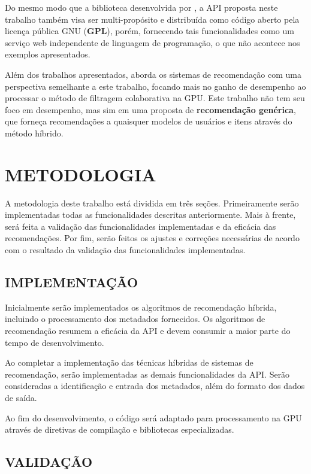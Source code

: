 \documentclass[12pt, openright, oneside, a4paper, brazil]{abntex2}
\begin{document}
Do mesmo modo que a biblioteca desenvolvida por , a API proposta neste trabalho também visa ser multi-propósito e distribuída como código aberto pela licença pública GNU (\textbf{GPL}), porém, fornecendo tais funcionalidades como um serviço web independente de linguagem de programação, o que não acontece nos exemplos apresentados.

Além dos trabalhos apresentados,  aborda os sistemas de recomendação com uma perspectiva semelhante a este trabalho, focando mais no ganho de desempenho ao processar o método de filtragem colaborativa na GPU. Este trabalho não tem seu foco em desempenho, mas sim em uma proposta de \textbf{recomendação genérica}, que forneça recomendações a quaisquer modelos de usuários e itens através do método híbrido.

%
%

\chapter{METODOLOGIA}

A metodologia deste trabalho está dividida em três seções. Primeiramente serão implementadas todas as funcionalidades descritas anteriormente. Mais à frente, será feita a validação das funcionalidades implementadas e da eficácia das recomendações. Por fim, serão feitos os ajustes e correções necessárias de acordo com o resultado da validação das funcionalidades implementadas.

\section{IMPLEMENTAÇÃO}

Inicialmente serão implementados os algoritmos de recomendação híbrida, incluindo o processamento dos metadados fornecidos. Os algoritmos de recomendação resumem a eficácia da API e devem consumir a maior parte do tempo de desenvolvimento.

Ao completar a implementação das técnicas híbridas de sistemas de recomendação, serão implementadas as demais funcionalidades da API. Serão consideradas a identificação e entrada dos metadados, além do formato dos dados de saída.

Ao fim do desenvolvimento, o código será adaptado para processamento na GPU através de diretivas de compilação e bibliotecas especializadas.

\section{VALIDAÇÃO}
\end{document}

